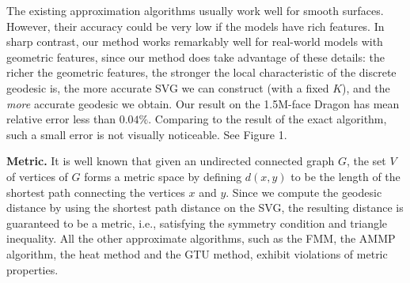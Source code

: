 The existing approximation algorithms usually work well for smooth
surfaces. However, their accuracy could be very low if the models
have rich features. In sharp contrast, our method works remarkably
well for real-world models with geometric features, since our method
does take advantage of these details: the richer the geometric
features, the stronger the local characteristic of the discrete
geodesic is, the more accurate SVG we can construct (with a fixed
$K$), and the \textit{more} accurate geodesic we obtain. Our result
on the 1.5M-face Dragon has mean relative error less than $0.04\%$.
Comparing to the result of the exact algorithm, such a small error
is not visually noticeable. See Figure 1.

\noindent\textbf{Metric.} It is well known that given an undirected
connected graph $G$, the set $V$ of vertices of $G$ forms a metric
space by defining $d(x,y)$ to be the length of the shortest path
connecting the vertices $x$ and $y$. Since we compute the geodesic
distance by using the shortest path distance on the SVG, the
resulting distance is guaranteed to be a metric, i.e., satisfying
the symmetry condition and triangle inequality. All the other
approximate algorithms, such as the FMM, the AMMP algorithm, the
heat method and the GTU method, exhibit violations of metric
properties.

